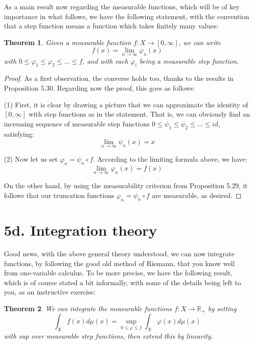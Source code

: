 \documentclass[12pt]{amsbook}
\newtheorem{theorem}{Theorem}[chapter]
\begin{document}
As a main result now regarding the measurable functions, which will be of key importance in what follows, we have the following statement, with the convention that a step function means a function which takes finitely many values:

\begin{theorem}
Given a measurable function $f:X\to[0,\infty]$, we can write
$$f(x)=\lim_{n\to\infty}\varphi_n(x)$$
with $0\leq\varphi_1\leq\varphi_2\leq\ldots\leq f$, and with each $\varphi_i$ being a measurable step function.
\end{theorem}

\begin{proof}
As a first observation, the converse holds too, thanks to the results in Proposition 5.30. Regarding now the proof, this goes as follows:

\medskip

(1) First, it is clear by drawing a picture that we can approximate the identity of $[0,\infty]$ with step functions as in the statement. That is, we can obviously find an increasing sequence of measurable step functions $0\leq\psi_1\leq\psi_2\leq\ldots\leq id$, satisfying:
$$\lim_{n\to\infty}\psi_n(x)=x$$ 

(2) Now let us set $\varphi_n=\psi_n\circ f$. According to the limiting formula above, we have:
$$\lim_{n\to\infty}\varphi_n(x)=f(x)$$

On the other hand, by using the measurability criterion from Proposition 5.29, it follows that our truncation functions $\varphi_n=\psi_n\circ f$ are measurable, as desired.
\end{proof}

\section*{5d. Integration theory} 

Good news, with the above general theory understood, we can now integrate functions, by following the good old method of Riemann, that you know well from one-variable calculus. To be more precise, we have the following result, which is of course stated a bit informally, with some of the details being left to you, as an instructive exercise:

\begin{theorem}
We can integrate the measurable functions $f:X\to\mathbb R_+$ by setting
$$\int_Xf(x)d\mu(x)=\sup_{0\leq\varphi\leq f}\int_X\varphi(x)d\mu(x)$$
with sup over measurable step functions, then extend this by linearity.
\end{theorem}
\end{document}
